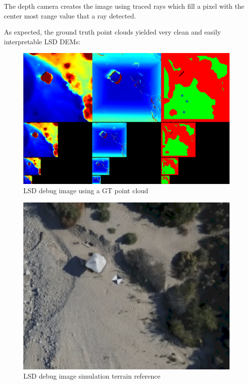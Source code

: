 The depth camera creates the image using traced rays which fill a pixel with the center most range value that a ray detected.

As expected, the ground truth point clouds yielded very clean and easily interpretable LSD DEMs:

\begin{figure}[ht]
\centering
\includegraphics[scale=0.25]{images/methodology/lsd_debug_image.png}
\caption{LSD debug image using a GT point cloud}
\label{fig:gt_lsd_debug}
\end{figure}

\begin{figure}[ht]
\centering
\includegraphics[scale=0.25]{images/methodology/lsd_debug_reference.png}
\caption{LSD debug image simulation terrain reference}
\label{fig:gt_lsd_debug_reference}
\end{figure}

